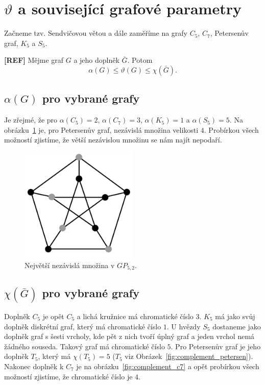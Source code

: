\section{$\vartheta$ a související grafové parametry}

Začneme tzv. Sendvičovou větou a dále zaměříme na grafy $C_5$, $C_7$, Petersenův graf, $K_5$ a $S_5$.

\begin{vt}\textbf{[REF]}
    Mějme graf $G$ a jeho doplněk $\bar{G}$. Potom
    $$
        \alpha(G) \leq \vartheta(G) \leq \chi(\bar{G}).
    $$
\end{vt}

\subsection*{$\alpha(G)$ pro vybrané grafy}
Je zřejmé, že pro $\alpha(C_5) = 2$, $\alpha(C_7) = 3$, $\alpha(K_5) = 1$ a $\alpha(S_5) = 5$. Na obrázku~\ref{fig:alpha_petersen} je, pro Petersenův graf, nezávislá množina velikosti $4$. Probírkou všech možností zjistíme, že větší nezávislou množinu se nám najít nepodaří.

\begin{figure}[h!]
    \centering
    \includegraphics[width=0.5\textwidth]{img/alpha_petersen.jpeg}   
    \caption{Největší nezávislá množina v $GP_{5,2}$.}
    \label{fig:alpha_petersen}
\end{figure}

\subsection*{$\chi(\bar{G})$ pro vybrané grafy}

Doplněk $C_5$ je opět $C_5$ a lichá kružnice má chromatické číslo $3$. $K_5$ má jako svůj doplněk diskrétní graf, který má chromatické číslo $1$. U hvězdy $S_5$ dostaneme jako doplněk graf s šesti vrcholy, kde pět z nich tvoří úplný graf a jeden vrchol nemá žádného souseda. Takový graf má chromatické číslo $5$. Pro Petersenův graf je jeho doplněk $T_5$, který má $\chi(T_5) = 5$ ($T_5$ viz Obrázek~\ref{fig:complement_petersen}). Nakonec doplněk k $C_7$ je na obrázku~\ref{fig:complement_c7} a opět probírkou všech možností zjistíme, že chromatické číslo je $4$.


